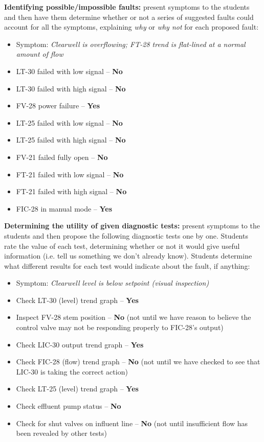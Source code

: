 \vskip 10pt


\noindent
{\bf Identifying possible/impossible faults:} present symptoms to the students and then have them determine whether or not a series of suggested faults could account for all the symptoms, explaining {\it why} or {\it why not} for each proposed fault:

\begin{itemize}
\item{} Symptom: {\it Clearwell is overflowing; FT-28 trend is flat-lined at a normal amount of flow}
\item{} LT-30 failed with low signal -- {\bf No}
\item{} LT-30 failed with high signal -- {\bf No}
\item{} FV-28 power failure -- {\bf Yes}
\item{} LT-25 failed with low signal -- {\bf No}
\item{} LT-25 failed with high signal -- {\bf No}
\item{} FV-21 failed fully open -- {\bf No}
\item{} FT-21 failed with low signal -- {\bf No}
\item{} FT-21 failed with high signal -- {\bf No}
\item{} FIC-28 in manual mode -- {\bf Yes}
\end{itemize}


\vskip 10pt


\noindent
{\bf Determining the utility of given diagnostic tests:} present symptoms to the students and then propose the following diagnostic tests one by one.  Students rate the value of each test, determining whether or not it would give useful information (i.e. tell us something we don't already know).  Students determine what different results for each test would indicate about the fault, if anything:

\begin{itemize}
\item{} Symptom: {\it Clearwell level is below setpoint (visual inspection)}
\item{} Check LT-30 (level) trend graph -- {\bf Yes}
\item{} Inspect FV-28 stem position -- {\bf No} (not until we have reason to believe the control valve may not be responding properly to FIC-28's output)
\item{} Check LIC-30 output trend graph -- {\bf Yes}
\item{} Check FIC-28 (flow) trend graph -- {\bf No} (not until we have checked to see that LIC-30 is taking the correct action)
\item{} Check LT-25 (level) trend graph -- {\bf Yes}
\item{} Check effluent pump status -- {\bf No}
\item{} Check for shut valves on influent line -- {\bf No} (not until insufficient flow has been revealed by other tests)
\end{itemize}


